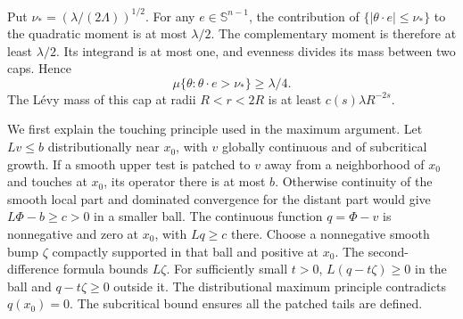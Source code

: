 \documentclass[11pt]{article}
\numberwithin{equation}{section}
\theoremstyle{remark}
\newcommand{\Sph}{\mathbb S^{n-1}}
\newcommand{\abs}[1]{\lvert #1\rvert}
\begin{document}
Put $\nu_*=(\lambda/(2\Lambda))^{1/2}$. For any $e\in\Sph$, the contribution of $\{\abs{\theta\cdot e}\le\nu_*\}$ to the quadratic moment is at most $\lambda/2$. The complementary moment is therefore at least $\lambda/2$. Its integrand is at most one, and evenness divides its mass between two caps. Hence
\begin{equation}\label{eq:cap}
 \mu\{\theta:\theta\cdot e>\nu_*\}\ge\lambda/4.
\end{equation}
The L\'evy mass of this cap at radii $R<r<2R$ is at least $c(s)\lambda R^{-2s}$.

We first explain the touching principle used in the maximum argument. Let $Lv\le b$ distributionally near $x_0$, with $v$ globally continuous and of subcritical growth. If a smooth upper test is patched to $v$ away from a neighborhood of $x_0$ and touches at $x_0$, its operator there is at most $b$. Otherwise continuity of the smooth local part and dominated convergence for the distant part would give $L\Phi-b\ge c>0$ in a smaller ball. The continuous function $q=\Phi-v$ is nonnegative and zero at $x_0$, with $Lq\ge c$ there. Choose a nonnegative smooth bump $\zeta$ compactly supported in that ball and positive at $x_0$. The second-difference formula bounds $L\zeta$. For sufficiently small $t>0$, $L(q-t\zeta)\ge0$ in the ball and $q-t\zeta\ge0$ outside it. The distributional maximum principle \cite[Lemma 2.3.5]{FRO} contradicts $q(x_0)=0$. The subcritical bound ensures all the patched tails are defined.
\end{document}
